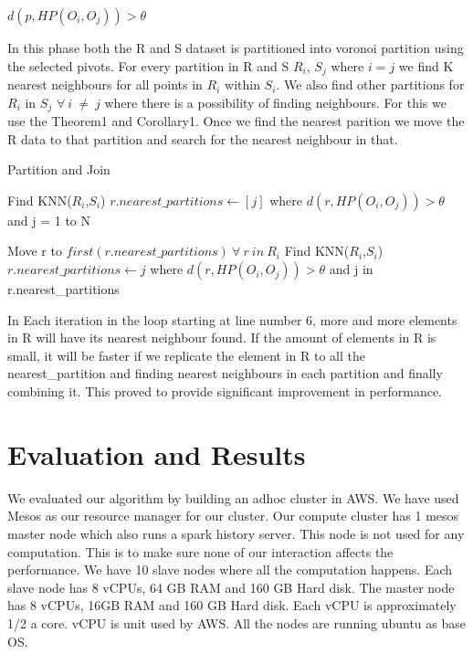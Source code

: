 \documentclass[12pt]{article}
\begin{document}
\medskip

$d(p, HP(O_i, O_j)) > \theta $

\medskip

In this phase both the R and S dataset is partitioned into voronoi
partition using the selected pivots. For every partition in R and S $R_i$,
$S_j$ where $i=j$ we find K nearest neighbours for all points in
$R_i$ within $S_i$. We also find other partitions for $R_i$ in $S_j$
$\forall\ i\ \neq\ j$ where there is a possibility of finding
neighbours. For this we use the Theorem1 and Corollary1.
Once we find the nearest parition we move the R data to that partition
and search for the nearest neighbour in that.

\begin{algorithm}
  \caption{Partition and Join}
  \label{algo_join}
  \begin{algorithmic}[1]

    \STATE Find KNN($R_i$,$S_i$)
    \STATE $r.nearest\_partitions \leftarrow [j]$
    \STATE where $d(r, HP(O_i, O_j)) > \theta$ and j = 1 to N
    \ENDFOR

    \STATE Move r to $first(r.nearest\_partitions)\ \forall\ r\ in\ R_i$
    \REPEAT
    \STATE Find KNN($R_i$,$S_i$)
    \STATE $r.nearest\_partitions \leftarrow j$
    \STATE where $d(r, HP(O_i, O_j)) > \theta$  and j in r.nearest\_partitions
    \ENDFOR

  \end{algorithmic}
\end{algorithm}

\bigskip

In Each iteration in the loop starting at line number 6, more and more elements in R will have its nearest
neighbour found. If the amount of elements in R is small, it will be
faster if we replicate the element in R to all the nearest\_partition
and finding nearest neighbours in each partition and finally combining
it. This proved to provide significant improvement in performance.

\bigskip

\section{Evaluation and Results}

We evaluated our algorithm by building an adhoc cluster in AWS. We
have used Mesos as our resource manager for our cluster. Our compute
cluster has 1 mesos master node which also runs a spark history
server. This node is not used for any computation. This is to make
sure none of our interaction affects the performance. We have 10 slave
nodes where all the computation happens. Each slave node has
8 vCPUs, 64 GB RAM and 160 GB Hard disk. The master node has 8 vCPUs,
16GB RAM and 160 GB Hard disk. Each vCPU is approximately 1/2 a
core. vCPU is unit used by AWS. All the nodes are running ubuntu as
base OS.
\end{document}
